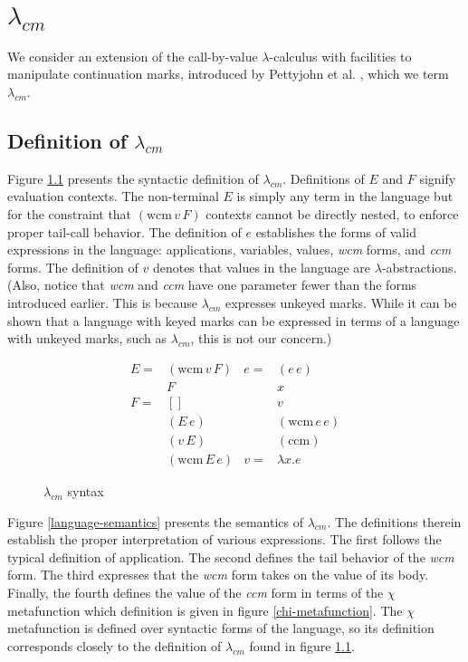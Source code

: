 \documentclass[ms,electronic,twosidetoc,letterpaper,chaptercenter,parttop]{byumsphd}
\begin{document}
\chapter{$\lambda_{cm}$}

We consider an extension of the call-by-value $\lambda$-calculus with facilities to
manipulate continuation marks, introduced by Pettyjohn et al.
\cite{pettyjohn2005continuations}, which we term $\lambda_{cm}$.

\section{Definition of $\lambda_{cm}$}

Figure \ref{language-syntax} presents the syntactic definition of $\lambda_{cm}$.
Definitions of $E$ and $F$ signify evaluation contexts. The non-terminal $E$ is simply any
term in the language but for the constraint that $(\mathrm{wcm}\,v\,F)$ contexts cannot be
directly nested, to enforce proper tail-call behavior. The definition of $e$ establishes
the forms of valid expressions in the language: applications, variables, values,
\emph{wcm} forms, and \emph{ccm} forms. The definition of $v$ denotes that values in the
language are $\lambda$-abstractions. (Also, notice that \emph{wcm} and \emph{ccm} have one
parameter fewer than the forms introduced earlier. This is because $\lambda_{cm}$
expresses unkeyed marks. While it can be shown that a language with keyed marks can be
expressed in terms of a language with unkeyed marks, such as $\lambda_{cm}$, this is not
our concern.)

\begin{figure}
\begin{align*}
E = &(\mathrm{wcm}\,v\,F) & e = &(e\,e)\\
    &F                    &     &x\\
F = &[]                   &     &v\\
    &(E\,e)               &     &(\mathrm{wcm}\,e\,e)\\
    &(v\,E)               &     &(\mathrm{ccm})\\
    &(\mathrm{wcm}\,E\,e) & v = & \lambda x. e
\end{align*}
\caption{$\lambda_{cm}$ syntax}
\label{language-syntax}
\end{figure}

Figure \ref{language-semantics} presents the semantics of $\lambda_{cm}$. The definitions
therein establish the proper interpretation of various expressions. The first follows the
typical definition of application. The second defines the tail behavior of the \emph{wcm}
form. The third expresses that the \emph{wcm} form takes on the value of its body.
Finally, the fourth defines the value of the \emph{ccm} form in terms of the $\chi$
metafunction which definition is given in figure \ref{chi-metafunction}. The $\chi$
metafunction is defined over syntactic forms of the language, so its definition
corresponds closely to the definition of $\lambda_{cm}$ found in figure
\ref{language-syntax}.
\end{document}
